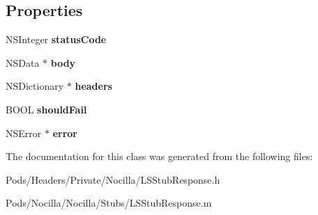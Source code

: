 \subsection*{Properties}
\begin{DoxyCompactItemize}
\item 
\hypertarget{interface_l_s_stub_response_a775478252984f11a7956e4b270497544}{N\-S\-Integer {\bfseries status\-Code}}\label{interface_l_s_stub_response_a775478252984f11a7956e4b270497544}

\item 
\hypertarget{interface_l_s_stub_response_ac1745762468bc0dc3d578062e9d3afd6}{N\-S\-Data $\ast$ {\bfseries body}}\label{interface_l_s_stub_response_ac1745762468bc0dc3d578062e9d3afd6}

\item 
\hypertarget{interface_l_s_stub_response_af97047e25bed5de0c8cc2208627eec6b}{N\-S\-Dictionary $\ast$ {\bfseries headers}}\label{interface_l_s_stub_response_af97047e25bed5de0c8cc2208627eec6b}

\item 
\hypertarget{interface_l_s_stub_response_a18c861aedb1cb191a620962396ead887}{B\-O\-O\-L {\bfseries should\-Fail}}\label{interface_l_s_stub_response_a18c861aedb1cb191a620962396ead887}

\item 
\hypertarget{interface_l_s_stub_response_a7dd5fe7b0f83bfaf274f0729156306b0}{N\-S\-Error $\ast$ {\bfseries error}}\label{interface_l_s_stub_response_a7dd5fe7b0f83bfaf274f0729156306b0}

\end{DoxyCompactItemize}


The documentation for this class was generated from the following files\-:\begin{DoxyCompactItemize}
\item 
Pods/\-Headers/\-Private/\-Nocilla/L\-S\-Stub\-Response.\-h\item 
Pods/\-Nocilla/\-Nocilla/\-Stubs/L\-S\-Stub\-Response.\-m\end{DoxyCompactItemize}
